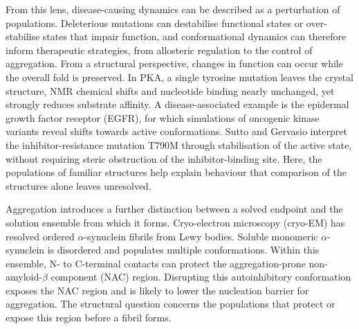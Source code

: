 From this lens, disease-causing dynamics can be described as a perturbation of populations. Deleterious mutations can destabilise functional states or over-stabilise states that impair function,\supercite{parraFrustrationPhysiologyMolecular2025,suttoEffectsOncogenicMutations2013} and conformational dynamics can therefore inform therapeutic strategies, from allosteric regulation to the control of aggregation.\supercite{lisiAllosteryEnzymeCatalysis2017,mukherjeeProteinMisfoldingAmyloid2024} From a structural perspective, changes in function can occur while the overall fold is preserved. In PKA, a single tyrosine mutation leaves the crystal structure, NMR chemical shifts and nucleotide binding nearly unchanged, yet strongly reduces substrate affinity.\supercite{lisiAllosteryEnzymeCatalysis2017} A disease-associated example is the epidermal growth factor receptor (EGFR), for which simulations of oncogenic kinase variants reveal shifts towards active conformations. Sutto and Gervasio interpret the inhibitor-resistance mutation T790M through stabilisation of the active state, without requiring steric obstruction of the inhibitor-binding site.\supercite{suttoEffectsOncogenicMutations2013} Here, the populations of familiar structures help explain behaviour that comparison of the structures alone leaves unresolved.

Aggregation introduces a further distinction between a solved endpoint and the solution ensemble from which it forms. Cryo-electron microscopy (cryo-EM) has resolved ordered $\alpha$-synuclein fibrils from Lewy bodies.\supercite{yanCryoEMStructuresInfectious2026,dhavaleStructureAlphasynucleinFibrils2024} Soluble monomeric $\alpha$-synuclein is disordered and populates multiple conformations.\supercite{ahmedRefinementASynucleinEnsembles2021} Within this ensemble, N- to C-terminal contacts can protect the aggregation-prone non-amyloid-$\beta$ component (NAC) region. Disrupting this autoinhibitory conformation exposes the NAC region and is likely to lower the nucleation barrier for aggregation.\supercite{mukherjeeProteinMisfoldingAmyloid2024} The structural question concerns the populations that protect or expose this region before a fibril forms.

